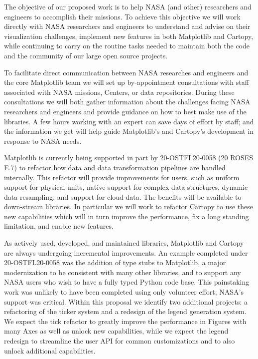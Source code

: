 \documentclass[12pt]{article}
\numberwithin{page}{section}
\begin{document}

The objective of our proposed work is to help NASA (and other) researchers and
engineers to accomplish their missions.
To achieve this objective we will work directly with NASA
researchers and engineers to understand and advise on their visualization
challenges, implement new features in both Matplotlib and Cartopy, while continuing
to carry on the routine tasks needed to maintain both the code and the community
of our large open source projects.

To facilitate direct communication between NASA researches and engineers and
the core Matplotlib team we will set up by-appointment consultations with staff
associated with NASA missions, Centers, or data repositories.  During these
consultations we will both gather information about the challenges facing NASA
researchers and engineers and provide guidance on how to best make use of the
libraries. A few hours working with an expert
can save days of effort by staff; and the information we get
will help guide Matplotlib's and Cartopy's development in
response to NASA needs.

Matplotlib is currently being supported in part by 20-OSTFL20-0058 (20 ROSES
E.7) to refactor how data and data transformation pipelines are handled
internally.  This refactor will provide improvements for users, such as
uniform support for physical units, native support for complex data
structures, dynamic data resampling, and support for cloud-data.  The benefits
will be available to down-stream libraries.
In particular we will work to refactor Cartopy to use these new capabilities which will in
turn improve the performance, fix a long standing limitation, and
enable new features.

As actively used, developed, and maintained libraries, Matplotlib and Cartopy
are always undergoing
incremental improvements.  An
example completed under 20-OSTFL20-0058 was the addition of type stubs to
Matplotlib, a major modernization to be consistent with many other libraries,
and to support any NASA users who wish to have a fully typed
Python code base.  This painstaking work was unlikely to have been completed using only
volunteer effort; NASA's support was critical.
Within this proposal we identify two additional projects: a refactoring of the
ticker system and a redesign of the legend generation system.  We expect the
tick refactor to greatly improve the performance in Figures with many Axes as
well as unlock new capabilities, while we expect the legend redesign to streamline
the user API for common customizations and to also unlock additional capabilities.
\end{document}
